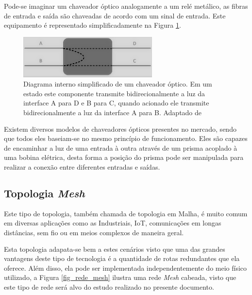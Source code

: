 \documentclass[12pt]{article}
\begin{document}

Pode-se imaginar um chaveador óptico analogamente a um relé metálico, as fibras de entrada e saída são chaveadas de acordo com um sinal de entrada. Este equipamento é representado simplificadamente na Figura \ref{fig_switch_optico}. 

\begin{figure} [h]%
	\centering
	\includegraphics[width=7cm]{Switch_optico}
	\caption{Diagrama interno simplificado de um chaveador óptico. Em um estado este componente transmite bidirecionalmente a luz da interface A para D e B para C, quando acionado ele transmite bidirecionalmente a luz da interface A para B. Adaptado de \cite{Accelink2014}}
	\label{fig_switch_optico}
\end{figure}

Existem diversos modelos de chaveadores ópticos presentes no mercado, sendo que todos eles baseiam-se no mesmo princípio de funcionamento. Eles são capazes de encaminhar a luz de uma entrada à outra através de um prisma acoplado à uma bobina elétrica, desta forma a posição do prisma pode ser manipulada para realizar a conexão entre diferentes entradas e saídas.

\subsection{Topologia \emph{Mesh}}
Este tipo de topologia, também chamada de topologia em Malha, é muito comum em diversas aplicações como as Industriais, IoT, comunicações em longas distâncias, sem fio ou em meios complexos de maneira geral. 

Esta topologia adapata-se bem a estes cenários visto que uma das grandes vantagens deste tipo de tecnologia é a quantidade de rotas redundantes que ela oferece. %
Além disso, ela pode ser implementada independentemente do meio físico utilizado, a Figura \ref{fig_rede_mesh} ilustra uma rede \emph{Mesh} cabeada, visto que este tipo de rede será alvo do estudo realizado no presente documento.
\end{document}
